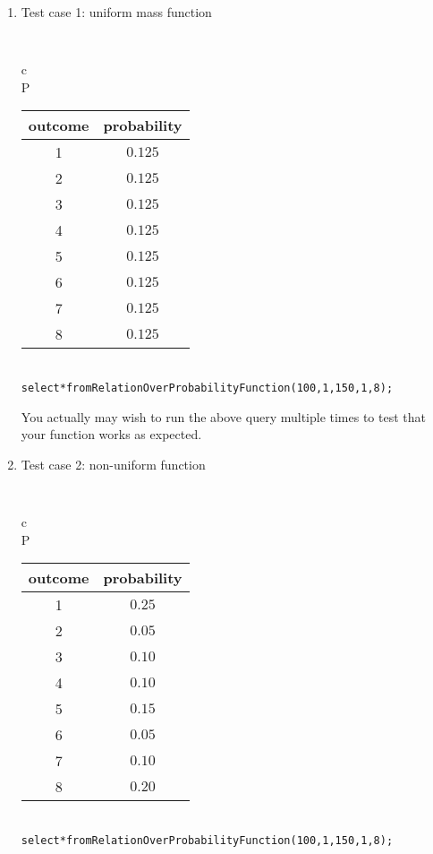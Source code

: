 \documentclass{article}
\newcommand{\blue}[1]{{\color{blue}#1}}
\begin{document}
\begin{enumerate}[resume]
\begin{enumerate}
\item Test case 1: uniform mass function

\begin{center}
{\tt 
\begin{tabular}{c} \\
P \\
\begin{tabular}{cc}
outcome & probability \\ \hline
1 & $0.125$ \\ 
2 & $0.125$ \\
3 & $0.125$ \\
4 & $0.125$ \\
5 & $0.125$ \\
6 & $0.125$ \\
7 & $0.125$ \\
8 & $0.125$ \\
\end{tabular}
\end{tabular}
}
\end{center}

\begin{alltt}\blue{
select * from RelationOverProbabilityFunction(100, 1, 150, 1, 8);}
\end{alltt}

You actually may wish to run the above query multiple times to test that
your function works as expected.

\item Test case 2: non-uniform function

\begin{center}
{\tt 
\begin{tabular}{c} \\
P \\
\begin{tabular}{cc}
outcome & probability \\ \hline
1 & $0.25$ \\ 
2 & $0.05$ \\
3 & $0.10$ \\
4 & $0.10$ \\
5 & $0.15$ \\
6 & $0.05$ \\
7 & $0.10$ \\
8 & $0.20$ \\
\end{tabular}
\end{tabular}
}
\end{center}

\begin{alltt}\blue{
select * from RelationOverProbabilityFunction(100, 1, 150, 1, 8);}
\end{alltt}


\end{enumerate}
\end{enumerate}
\end{document}

